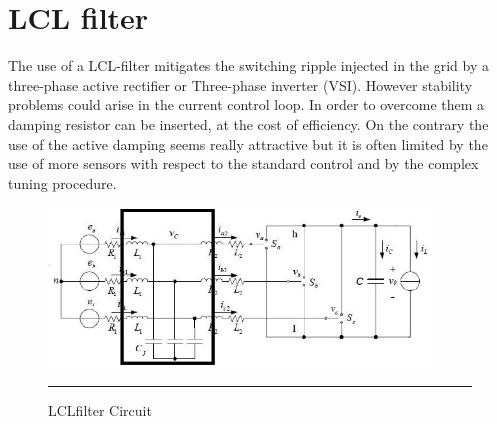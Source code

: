\section{LCL filter}
The use of a LCL-filter mitigates the switching ripple injected in the grid by a three-phase
active rectifier or Three-phase inverter (VSI). However stability problems could arise in the
current control loop. In order to overcome them a damping resistor can be inserted, at the cost of
efficiency. On the contrary the use of the active damping seems really attractive but it is often
limited by the use of more sensors with respect to the standard control and by the complex tuning
procedure.
\begin{figure}[htbp]
	\centering
		\includegraphics[width = 4in]{./Figures/LCLfilter.jpg}
		\rule{35em}{5pt}
	\caption{LCLfilter Circuit}
	\label{fig:1}
\end{figure}